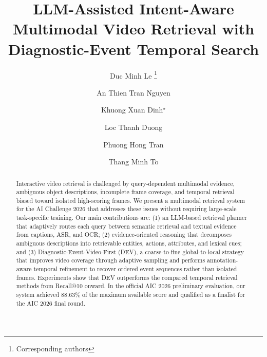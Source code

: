 \documentclass[runningheads]{llncs}
\begin{document}
%
\title{LLM-Assisted Intent-Aware Multimodal Video Retrieval with Diagnostic-Event Temporal Search}
%
%
%
\newcommand{\corrmark}{\unskip$^{\star}$}
\newcommand{\equalcontrib}{\textsuperscript{\dagger}}

\author{
Duc Minh Le\fnmsep
\thanks{Corresponding authors}
\and
An Thien Tran Nguyen
\and
Khuong Xuan Dinh\fnmsep\corrmark
\and
Loc Thanh Duong
\and
Phuong Hong Tran
\and
Thang Minh To
}





%



\maketitle              %
%
\begin{abstract}
Interactive video retrieval is challenged by query-dependent multimodal evidence, ambiguous object descriptions, incomplete frame coverage, and temporal retrieval biased toward isolated high-scoring frames. We present a multimodal retrieval system for the AI Challenge 2026 that addresses these issues without requiring large-scale task-specific training. Our main contributions are: (1) an LLM-based retrieval planner that adaptively routes each query between semantic retrieval and textual evidence from captions, ASR, and OCR; (2) evidence-oriented reasoning that decomposes ambiguous descriptions into retrievable entities, actions, attributes, and lexical cues; and (3) Diagnostic-Event-Video-First (DEV), a coarse-to-fine global-to-local strategy that improves video coverage through adaptive sampling and performs annotation-aware temporal refinement to recover ordered event sequences rather than isolated frames. Experiments show that DEV outperforms the compared temporal retrieval methods from Recall@10 onward. In the official AIC 2026 preliminary evaluation, our system achieved $88.63\%$ of the maximum available score and qualified as a finalist for the AIC 2026 final round.
\end{abstract}
\end{document}
